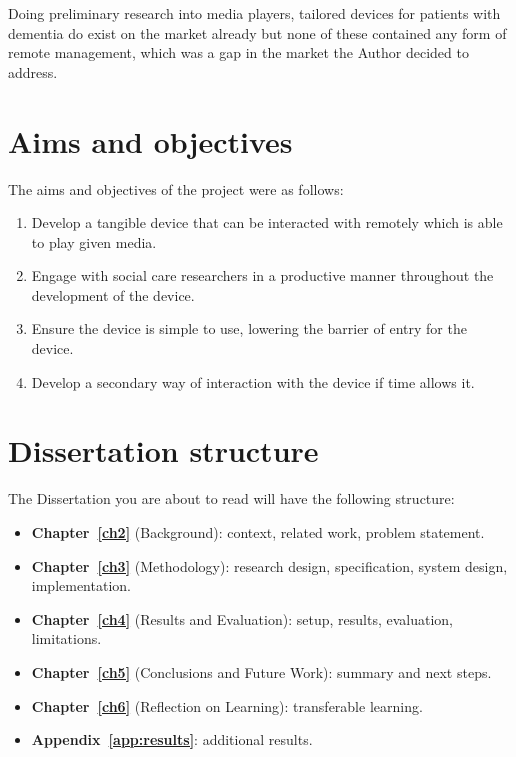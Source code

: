 Doing preliminary research into media players, tailored devices for patients with dementia do exist on the market already but none of these contained any form of remote management, which was a gap in the market the Author decided to address.


\section{Aims and objectives}\label{sec:objectives}
The aims and objectives of the project were as follows:
\begin{enumerate}
  \item Develop a tangible device that can be interacted with remotely which is able to play given media.
  \item Engage with social care researchers in a productive manner throughout the development of the device.
  \item Ensure the device is simple to use, lowering the barrier of entry for the device.
  \item Develop a secondary way of interaction with the device if time allows it.
\end{enumerate}


\section{Dissertation structure}\label{sec:roadmap}
The Dissertation you are about to read will have the following structure: 
\begin{itemize}
  \item \textbf{Chapter~\ref{ch2}} (Background): context, related work, problem statement.
  \item \textbf{Chapter~\ref{ch3}} (Methodology): research design, specification, system design, implementation.
  \item \textbf{Chapter~\ref{ch4}} (Results and Evaluation): setup, results, evaluation, limitations.
  \item \textbf{Chapter~\ref{ch5}} (Conclusions and Future Work): summary and next steps.
  \item \textbf{Chapter~\ref{ch6}} (Reflection on Learning): transferable learning.
  \item \textbf{Appendix~\ref{app:results}}: additional results.
\end{itemize}


